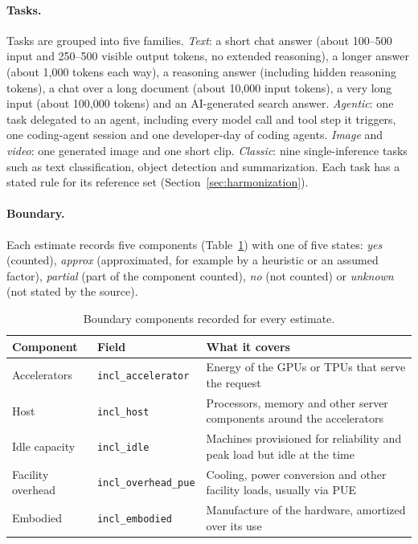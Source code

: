 \documentclass[11pt]{article}
\newcommand{\file}[1]{\texttt{#1}}
\begin{document}
\paragraph{Tasks.}
Tasks are grouped into five families. \emph{Text}: a short chat answer (about 100--500 input and 250--500 visible output tokens, no extended reasoning), a longer answer (about 1{,}000 tokens each way), a reasoning answer (including hidden reasoning tokens), a chat over a long document (about 10{,}000 input tokens), a very long input (about 100{,}000 tokens) and an AI-generated search answer. \emph{Agentic}: one task delegated to an agent, including every model call and tool step it triggers, one coding-agent session and one developer-day of coding agents. \emph{Image} and \emph{video}: one generated image and one short clip. \emph{Classic}: nine single-inference tasks such as text classification, object detection and summarization. Each task has a stated rule for its reference set (Section~\ref{sec:harmonization}).

\paragraph{Boundary.}
Each estimate records five components (Table~\ref{tab:boundary}) with one of five states: \emph{yes} (counted), \emph{approx} (approximated, for example by a heuristic or an assumed factor), \emph{partial} (part of the component counted), \emph{no} (not counted) or \emph{unknown} (not stated by the source).

\begin{table}[t]
  \centering
  \small
  \caption{Boundary components recorded for every estimate.}
  \label{tab:boundary}
  \begin{tabularx}{\linewidth}{@{}l l X@{}}
    \toprule
    Component & Field & What it covers \\
    \midrule
    Accelerators & \file{incl\_accelerator} & Energy of the GPUs or TPUs that serve the request \\
    Host & \file{incl\_host} & Processors, memory and other server components around the accelerators \\
    Idle capacity & \file{incl\_idle} & Machines provisioned for reliability and peak load but idle at the time \\
    Facility overhead & \file{incl\_overhead\_pue} & Cooling, power conversion and other facility loads, usually via PUE \\
    Embodied & \file{incl\_embodied} & Manufacture of the hardware, amortized over its use \\
    \bottomrule
  \end{tabularx}
\end{table}
\end{document}
